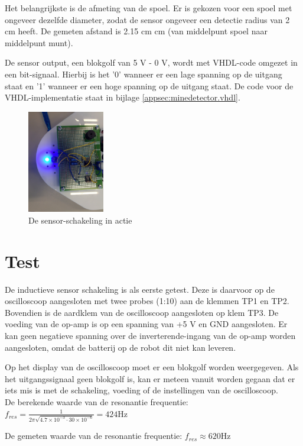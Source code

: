 \documentclass{report}
\begin{document}
Het belangrijkste is de afmeting van de spoel. Er is gekozen voor een spoel met ongeveer dezelfde diameter, zodat de sensor ongeveer een detectie radius van 2 cm heeft. De gemeten afstand is 2.15 cm  cm (van middelpunt spoel naar middelpunt munt).

De sensor output, een blokgolf van 5 V - 0 V, wordt met VHDL-code omgezet in een bit-signaal. Hierbij is het '0' wanneer er een lage spanning op de uitgang staat en '1' wanneer er een hoge spanning op de uitgang staat. De code voor de VHDL-implementatie staat in bijlage \ref{appsec:minedetector.vhdl}.

\begin{figure}[H]
	\centering
	\includegraphics[width=0.3\textwidth]{sensor-schakeling.jpg}
	\caption{De sensor-schakeling in actie}
	\label{fig:sensor-schakeling}
\end{figure}

\section{Test}
De inductieve sensor schakeling is als eerste getest. Deze is daarvoor op de oscilloscoop aangesloten met twee probes (1:10) aan de klemmen TP1 en TP2. Bovendien is de aardklem van de oscilloscoop aangesloten op klem TP3. De voeding van de op-amp is op een spanning van +5 V en GND aangesloten. Er kan geen negatieve spanning over de inverterende-ingang van de op-amp worden aangesloten, omdat de batterij op de robot dit niet kan leveren. 

Op het display van de oscilloscoop moet er een blokgolf worden weergegeven. Als het uitgangssignaal geen blokgolf is, kan er meteen vanuit worden gegaan dat er iets mis is met de schakeling, voeding of de instellingen van de oscilloscoop.\\
De berekende waarde van de resonantie frequentie:
$f_{res}=\frac{1}{2\pi \sqrt{4.7\times 10^{-3}\cdot 30\times 10^{-6}}}= 424 \mathrm{Hz}$

\noindent De gemeten waarde van de resonantie frequentie:
$f_{res}\approx620 \mathrm{Hz}$\\
\end{document}
